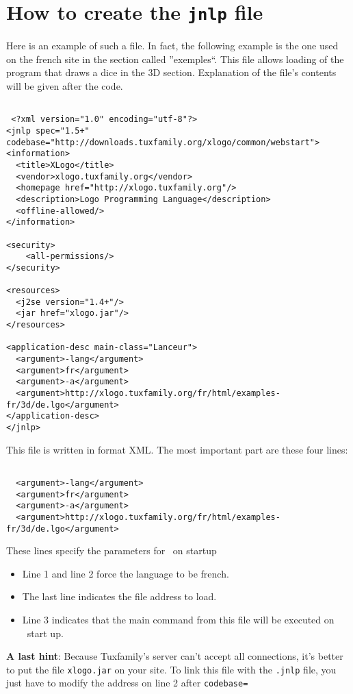 \section{How to create the \texttt{jnlp} file}
Here is an example of such a file. In fact, the following example is the one used on the french site in the section called ''exemples``. This file allows loading of the program that draws a dice in the 3D section. Explanation of the file's contents will be given after the code.
\begin{verbatim}

 <?xml version="1.0" encoding="utf-8"?>
<jnlp spec="1.5+" codebase="http://downloads.tuxfamily.org/xlogo/common/webstart">
<information>
  <title>XLogo</title>
  <vendor>xlogo.tuxfamily.org</vendor>
  <homepage href="http://xlogo.tuxfamily.org"/>
  <description>Logo Programming Language</description>
  <offline-allowed/>
</information>

<security>
	<all-permissions/>
</security>

<resources>
  <j2se version="1.4+"/>
  <jar href="xlogo.jar"/>
</resources>

<application-desc main-class="Lanceur">
  <argument>-lang</argument>
  <argument>fr</argument>
  <argument>-a</argument>
  <argument>http://xlogo.tuxfamily.org/fr/html/examples-fr/3d/de.lgo</argument>
</application-desc>
</jnlp>

\end{verbatim}
This file is written in format XML. The most important part are these four lines:
\begin{verbatim}

  <argument>-lang</argument>
  <argument>fr</argument>
  <argument>-a</argument>
  <argument>http://xlogo.tuxfamily.org/fr/html/examples-fr/3d/de.lgo</argument>

\end{verbatim}
These lines specify the parameters for \xlogo\ on startup 
\begin{itemize}
 \item Line 1 and line 2 force the language to be french.
\item The last line indicates the file address to load.
\item Line 3 indicates that the main command from this file will be executed on \xlogo\ start up.
\end{itemize}
\vspace{0.5cm}
\textbf{A last hint}: Because Tuxfamily's server can't accept all connections, it's better to put the file \texttt{xlogo.jar} on your site. To link this file with the \texttt{.jnlp} file, you just have to modify the address on line 2 after \texttt{codebase=}